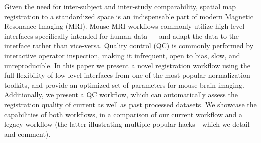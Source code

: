 Given the need for inter-subject and inter-study comparability, spatial map registration to a standardized space is an indispensable part of modern Magnetic Resonance Imaging (MRI).
Mouse MRI workflows commonly utilize high-level interfaces specifically intended for human data --- and adapt the data to the interface rather than vice-versa.
Quality control (QC) is commonly performed by interactive operator inspection, making it infrequent, open to bias, slow, and unreproducible.
In this paper we present a novel registration workflow using the full flexibility of low-level interfaces from one of the most popular normalization toolkits, and provide an optimized set of parameters for mouse brain imaging.
Additionally, we present a QC workflow, which can automatically assess the registration quality of current as well as past processed datasets.
We showcase the capabilities of both workflows, in a comparison of our current workflow and a legacy workflow (the latter illustrating multiple popular hacks - which we detail and comment).
